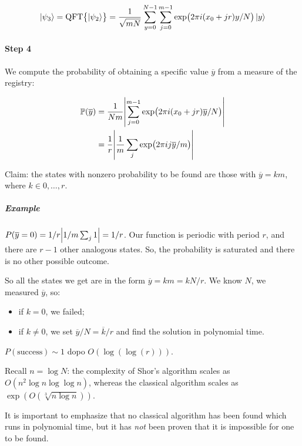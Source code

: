 \documentclass[main_montangero.tex]{subfiles}
\begin{document}
\begin{equation}
  \ket{\psi _3} = \text{QFT}\qty{\ket{\psi_2}} = \frac{1}{\sqrt{mN}} \sum _{y=0} ^{N-1} \sum _{j=0} ^{m-1} \exp(2 \pi i (x_0 + jr) y/N) \ket{y}
\end{equation}

\paragraph{Step 4}

We compute the probability of obtaining a specific value \(\overline{y} \) from a measure of the registry:

\begin{subequations}
\begin{align}
  \mathbb{P}\qty(\overline{y})
  &= \frac{1}{Nm} \abs{\sum _{j=0} ^{m-1} \exp(2 \pi i (x_0 + jr) \overline{y}/N) }  \\
  &= \frac{1}{r} \abs{\frac{1}{m} \sum_j \exp(2 \pi i j \overline{y} /m)}
\end{align}
\end{subequations}

Claim: the states with nonzero probability to be found are those with \( \overline{y} = km \), where \( k \in 0, \dots,  r \).

\subparagraph{Example}

\( P(\overline{y} = 0) = 1/r \abs{1/m \sum_j 1} = 1/r \). Our function is periodic with period \(r\), and there are \(r-1\) other analogous states. So, the probability is saturated and there is no other possible outcome.

So all the states we get are in the form \( \overline{y}=km = kN/r \). We know $N$, we measured \( \overline{y} \), so:

\begin{itemize}
  \item if \( k=0 \), we failed;
  \item if \( k\neq 0 \), we set \( \overline{y}/N = \overline{k}/r \) and find the solution in polynomial time.
\end{itemize}

\( P(\text{success}) \sim 1 \) dopo \( O(\log(\log(r))) \).

Recall \( n = \log N \): the complexity of Shor's algorithm scales as \( O(n^2 \log n \log \log n) \), whereas the classical algorithm scales as \( \exp(O(\sqrt[3]{n\log n})) \).

It is important to emphasize that no classical algorithm has been found which runs in polynomial time, but it has \emph{not} been proven that it is impossible for one to be found.
\end{document}
